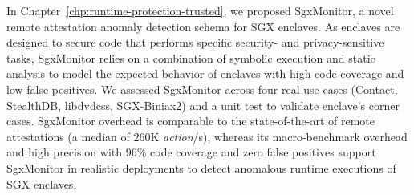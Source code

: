 In Chapter~\ref{chp:runtime-protection-trusted}, we proposed SgxMonitor, a 
novel remote attestation anomaly detection schema for SGX enclaves. As enclaves 
are designed to secure code that performs specific security- and 
privacy-sensitive tasks, SgxMonitor relies on a combination of symbolic 
execution and static analysis to model the expected behavior of enclaves with 
high code coverage and low false positives.  
We assessed SgxMonitor across four real use cases (\ie \textsf{Contact}, 
\textsf{StealthDB}, \textsf{libdvdcss}, \textsf{SGX-Biniax2}) and a 
\textsf{unit test} to validate enclave's corner cases. SgxMonitor overhead is 
comparable to the state-of-the-art of remote attestations (a median of $260$K
\emph{action}/s), whereas its macro-benchmark overhead and high precision
with $96$\% code coverage and zero false positives support SgxMonitor in 
realistic deployments to detect anomalous runtime executions of SGX enclaves.






